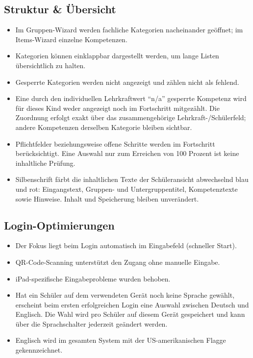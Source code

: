 \documentclass[12pt,a4paper]{article}
\begin{document}
\subsection{Struktur \& Übersicht}
\begin{itemize}
  \item Im Gruppen-Wizard werden fachliche Kategorien nacheinander geöffnet; im Items-Wizard einzelne Kompetenzen.
  \item Kategorien können einklappbar dargestellt werden, um lange Listen übersichtlich zu halten.
  \item Gesperrte Kategorien werden nicht angezeigt und zählen nicht als fehlend.
  \item Eine durch den individuellen Lehrkraftwert \enquote{n/a} gesperrte Kompetenz wird für dieses Kind weder angezeigt noch im Fortschritt mitgezählt. Die Zuordnung erfolgt exakt über das zusammengehörige Lehrkraft-/Schülerfeld; andere Kompetenzen derselben Kategorie bleiben sichtbar.
  \item Pflichtfelder beziehungsweise offene Schritte werden im Fortschritt berücksichtigt. Eine Auswahl nur zum Erreichen von 100 Prozent ist keine inhaltliche Prüfung.
  \item Silbenschrift färbt die inhaltlichen Texte der Schüleransicht abwechselnd blau und rot: Eingangstext, Gruppen- und Untergruppentitel, Kompetenztexte sowie Hinweise. Inhalt und Speicherung bleiben unverändert.
\end{itemize}

\subsection{Login-Optimierungen}
\begin{itemize}
  \item Der Fokus liegt beim Login automatisch im Eingabefeld (schneller Start).
  \item QR-Code-Scanning unterstützt den Zugang ohne manuelle Eingabe.
  \item iPad-spezifische Eingabeprobleme wurden behoben.
  \item Hat ein Schüler auf dem verwendeten Gerät noch keine Sprache gewählt, erscheint beim ersten erfolgreichen Login eine Auswahl zwischen Deutsch und Englisch. Die Wahl wird pro Schüler auf diesem Gerät gespeichert und kann über die Sprachschalter jederzeit geändert werden.
  \item Englisch wird im gesamten System mit der US-amerikanischen Flagge gekennzeichnet.
\end{itemize}
\end{document}
